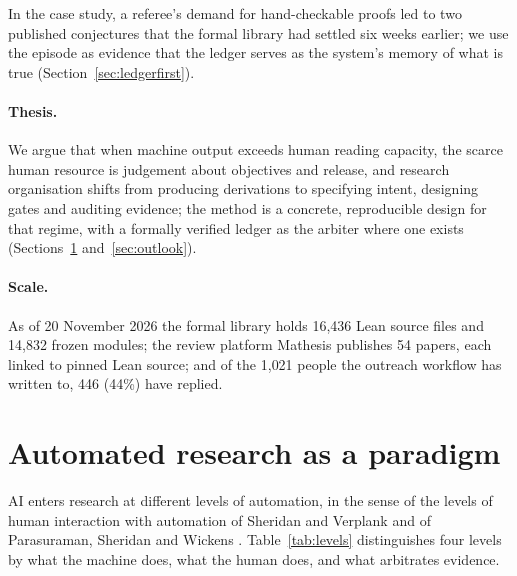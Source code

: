 \documentclass[11pt]{article}
\begin{document}
In the case study, a referee's demand for hand-checkable proofs led to two
published conjectures that the formal library had settled six weeks earlier;
we use the episode as evidence that the ledger serves as the system's memory
of what is true (Section~\ref{sec:ledgerfirst}).

\paragraph{Thesis.} We argue that when machine output exceeds human reading
capacity, the scarce human resource is judgement about objectives and
release, and research organisation shifts from producing derivations to
specifying intent, designing gates and auditing evidence; the method is a
concrete, reproducible design for that regime, with a formally verified
ledger as the arbiter where one exists (Sections~\ref{sec:paradigm}
and~\ref{sec:outlook}).

\paragraph{Scale.} As of 20 November 2026 the formal library holds 16{,}436
Lean source files and 14{,}832 frozen modules; the review platform Mathesis
publishes 54 papers, each linked to pinned Lean source; and of the 1{,}021
people the outreach workflow has written to, 446 (44\%) have replied.

\section{Automated research as a paradigm}
\label{sec:paradigm}
AI enters research at different levels of automation, in the sense of the
levels of human interaction with automation of Sheridan and Verplank and of
Parasuraman, Sheridan and Wickens \citep{sheridan,parasuraman}.
Table~\ref{tab:levels} distinguishes four levels by what the machine does,
what the human does, and what arbitrates evidence.
\end{document}
